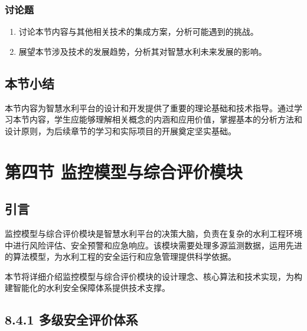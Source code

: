 \hypertarget{ux8ba8ux8bbaux9898-1}{%
\subsubsection{讨论题}\label{ux8ba8ux8bbaux9898-1}}

\begin{enumerate}
\def\labelenumi{\arabic{enumi}.}
\tightlist
\item
  讨论本节内容与其他相关技术的集成方案，分析可能遇到的挑战。
\item
  展望本节涉及技术的发展趋势，分析其对智慧水利未来发展的影响。
\end{enumerate}

\hypertarget{ux672cux8282ux5c0fux7ed3-1}{%
\subsection{本节小结}\label{ux672cux8282ux5c0fux7ed3-1}}

本节内容为智慧水利平台的设计和开发提供了重要的理论基础和技术指导。通过学习本节内容，学生应能够理解相关概念的内涵和应用价值，掌握基本的分析方法和设计原则，为后续章节的学习和实际项目的开展奠定坚实基础。

\hypertarget{ux7b2cux56dbux8282-ux76d1ux63a7ux6a21ux578bux4e0eux7efcux5408ux8bc4ux4ef7ux6a21ux5757}{%
\section{第四节 监控模型与综合评价模块}\label{ux7b2cux56dbux8282-ux76d1ux63a7ux6a21ux578bux4e0eux7efcux5408ux8bc4ux4ef7ux6a21ux5757}}

\hypertarget{ux5f15ux8a00-3}{%
\subsection{引言}\label{ux5f15ux8a00-3}}

监控模型与综合评价模块是智慧水利平台的决策大脑，负责在复杂的水利工程环境中进行风险评估、安全预警和应急响应。该模块需要处理多源监测数据，运用先进的算法模型，为水利工程的安全运行和应急管理提供科学依据。

本节将详细介绍监控模型与综合评价模块的设计理念、核心算法和技术实现，为构建智能化的水利安全保障体系提供技术支撑。

\hypertarget{ux591aux7ea7ux5b89ux5168ux8bc4ux4ef7ux4f53ux7cfb}{%
\subsection{8.4.1 多级安全评价体系}\label{ux591aux7ea7ux5b89ux5168ux8bc4ux4ef7ux4f53ux7cfb}}

